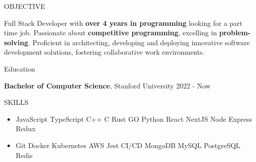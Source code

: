 \documentclass{resume} %
\newcommand{\separator}{ \textbar \hspace{0.2cm}}
\begin{document}

\begin{rSection}{OBJECTIVE}

{Full Stack Developer with \textbf{over 4 years in programming} looking for a part time job. Passionate about \textbf{competitive programming}, excelling in \textbf{problem-solving}. Proficient in architecting, developing and deploying innovative software development solutions, fostering collaborative work environments.}


\end{rSection}

\begin{rSection}{Education}

{

{\bf Bachelor of Computer Science}, Stanford University \hfill {2022 - Now}}

\end{rSection}
\begin{rSection}{SKILLS}

\begin{itemize}
    \item JavaScript \separator TypeScript \separator C++ \separator C \separator Rust \separator GO \separator Python \separator React \separator NextJS \separator Node \separator Express \separator Redux
    \item Git \separator Docker \separator Kubernetes \separator AWS \separator Jest \separator CI/CD \separator MongoDB \separator MySQL \separator PostgreSQL \separator Redis
    
\end{itemize}
\end{rSection}
\end{document}
